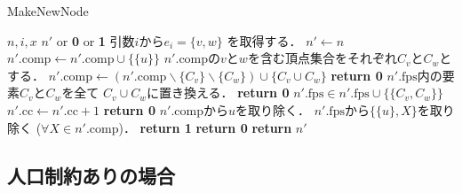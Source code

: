 \begin{breakablealgorithm}
  \caption{MakeNewNode}
  \label{make_new_node}
  \begin{algorithmic}[1]
    \Require $n,i,x$
    \Ensure $n'$ or \textbf{0} or \textbf{1}
    \State 引数$i$から$e_i=\{v,w\}$ を取得する．
    \State $n' \gets n$
        \State $n'.\mathrm{comp} \gets n'.\mathrm{comp} \cup \{\{u\}\}$
      \EndIf
    \EndFor
    \State $n'.\mathrm{comp}$の$v$と$w$を含む頂点集合をそれぞれ$C_v$と$C_w$とする．
      \State $n'.\mathrm{comp} \gets (n'.\mathrm{comp} \backslash \{C_v\} \backslash \{C_w\})
        \cup \{C_v \cup C_w\}$
        \State \textbf{return 0}
      \Else
        \State $n'.\mathrm{fps}$内の要素$C_v$と$C_w$を全て
          $C_v \cup C_w$に置き換える．
      \EndIf
    \Else
        \State \textbf{return 0}
      \Else
        \State $n'.\mathrm{fps} \in n'.\mathrm{fps} \cup \{\{C_v, C_w\}\}$
      \EndIf
    \EndIf
        \State $n'.\mathrm{cc} \gets n'.\mathrm{cc} + 1$
          \State \textbf{return 0}
        \EndIf
      \EndIf
      \State $n'.\mathrm{comp}$から$u$を取り除く．
      \State $n'.\mathrm{fps}$から$\{\{u\},X\}$を取り除く
        ($\forall X \in n'.\mathrm{comp}$)．
    \EndIf
  \EndFor
      \State \textbf{return 1}
    \Else
      \State \textbf{return 0}
    \EndIf
  \EndIf
  \State \textbf{return }$n'$
  \end{algorithmic}
\end{breakablealgorithm}

\subsection{人口制約ありの場合}
